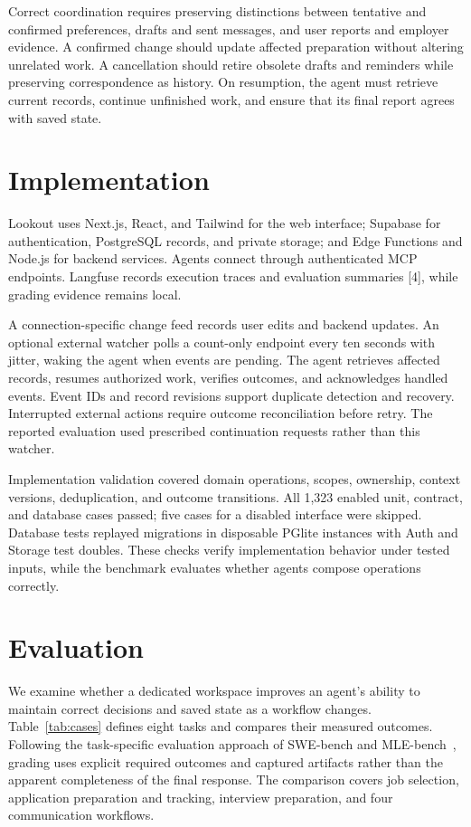 \documentclass[twocolumn]{article}
\begin{document}
Correct coordination requires preserving distinctions between tentative and confirmed preferences, drafts and sent messages, and user reports and employer evidence. A confirmed change should update affected preparation without altering unrelated work. A cancellation should retire obsolete drafts and reminders while preserving correspondence as history. On resumption, the agent must retrieve current records, continue unfinished work, and ensure that its final report agrees with saved state.

\section{Implementation}

Lookout uses Next.js, React, and Tailwind for the web interface; Supabase for authentication, PostgreSQL records, and private storage; and Edge Functions and Node.js for backend services. Agents connect through authenticated MCP endpoints. Langfuse records execution traces and evaluation summaries [4], while grading evidence remains local.

A connection-specific change feed records user edits and backend updates. An optional external watcher polls a count-only endpoint every ten seconds with jitter, waking the agent when events are pending. The agent retrieves affected records, resumes authorized work, verifies outcomes, and acknowledges handled events. Event IDs and record revisions support duplicate detection and recovery. Interrupted external actions require outcome reconciliation before retry. The reported evaluation used prescribed continuation requests rather than this watcher.

Implementation validation covered domain operations, scopes, ownership, context versions, deduplication, and outcome transitions. All 1,323 enabled unit, contract, and database cases passed; five cases for a disabled interface were skipped. Database tests replayed migrations in disposable PGlite instances with Auth and Storage test doubles. These checks verify implementation behavior under tested inputs, while the benchmark evaluates whether agents compose operations correctly.
\section{Evaluation}

We examine whether a dedicated workspace improves an agent's ability to maintain correct decisions and saved state as a workflow changes. Table~\ref{tab:cases} defines eight tasks and compares their measured outcomes. Following the task-specific evaluation approach of SWE-bench and MLE-bench~\cite{swebench,mlebench}, grading uses explicit required outcomes and captured artifacts rather than the apparent completeness of the final response. The comparison covers job selection, application preparation and tracking, interview preparation, and four communication workflows.
\end{document}
